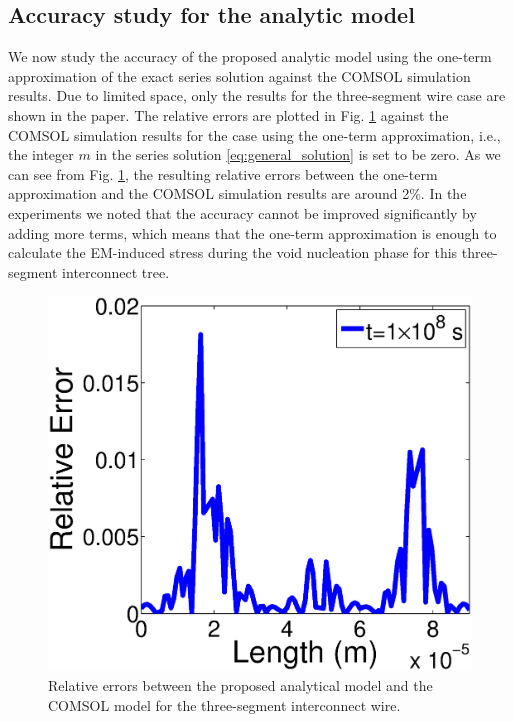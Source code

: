 \subsection{Accuracy study for the analytic model}
We now study the accuracy of the proposed analytic model using the one-term approximation of the exact series solution against the COMSOL simulation results.
Due to limited space, only the results for the three-segment wire case are shown in the paper. The relative errors are plotted in Fig. \ref{fig:TimeError1e8} against the COMSOL simulation results for the case using the one-term approximation, i.e., the integer $m$ in the series solution \eqref{eq:general_solution} is set to be zero. As we can see from Fig. \ref{fig:TimeError1e8}, the resulting relative errors between the one-term approximation and the COMSOL simulation results are around 2\%. In the experiments we noted that the accuracy cannot be improved significantly by adding more terms, which means that the one-term approximation is enough to calculate the EM-induced stress during the void nucleation phase for this three-segment interconnect tree.
\begin{figure}[!h]
\centering
\includegraphics[width=0.7\columnwidth]{TimeError1e8.eps}
\caption{Relative errors between the proposed analytical model and the
COMSOL model for the three-segment interconnect wire.}
\label{fig:TimeError1e8}
\end{figure}

